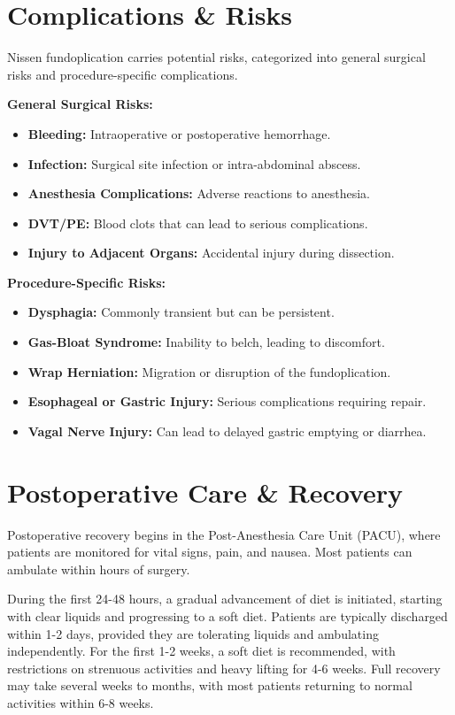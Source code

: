 \section*{Complications \& Risks}
Nissen fundoplication carries potential risks, categorized into general surgical risks and procedure-specific complications.

\textbf{General Surgical Risks:}
\begin{itemize}
  \item \textbf{Bleeding:} Intraoperative or postoperative hemorrhage.
  \item \textbf{Infection:} Surgical site infection or intra-abdominal abscess.
  \item \textbf{Anesthesia Complications:} Adverse reactions to anesthesia.
  \item \textbf{DVT/PE:} Blood clots that can lead to serious complications.
  \item \textbf{Injury to Adjacent Organs:} Accidental injury during dissection.
\end{itemize}

\textbf{Procedure-Specific Risks:}
\begin{itemize}
  \item \textbf{Dysphagia:} Commonly transient but can be persistent.
  \item \textbf{Gas-Bloat Syndrome:} Inability to belch, leading to discomfort.
  \item \textbf{Wrap Herniation:} Migration or disruption of the fundoplication.
  \item \textbf{Esophageal or Gastric Injury:} Serious complications requiring repair.
  \item \textbf{Vagal Nerve Injury:} Can lead to delayed gastric emptying or diarrhea.
\end{itemize}

\section*{Postoperative Care \& Recovery}
Postoperative recovery begins in the Post-Anesthesia Care Unit (PACU), where patients are monitored for vital signs, pain, and nausea. Most patients can ambulate within hours of surgery. 

During the first 24-48 hours, a gradual advancement of diet is initiated, starting with clear liquids and progressing to a soft diet. Patients are typically discharged within 1-2 days, provided they are tolerating liquids and ambulating independently. For the first 1-2 weeks, a soft diet is recommended, with restrictions on strenuous activities and heavy lifting for 4-6 weeks. Full recovery may take several weeks to months, with most patients returning to normal activities within 6-8 weeks.

